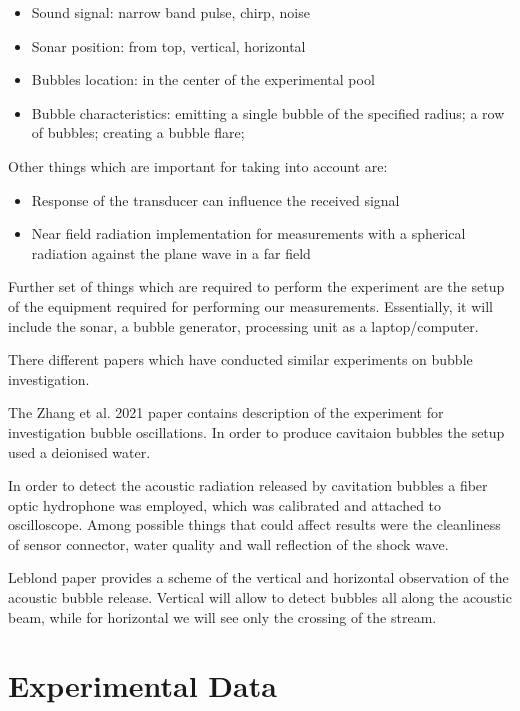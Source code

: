 \begin{itemize}
    \item  Sound signal: narrow band pulse, chirp, noise
    \item Sonar position: from top, vertical, horizontal
    \item Bubbles location: in the center of the experimental pool
   \item Bubble characteristics: emitting a single bubble of the specified radius; a row of bubbles; 
   creating a bubble flare;
\end{itemize}
Other things which are important for taking into account are:
\begin{itemize}
    \item Response of the transducer can influence the received signal
    \item Near field radiation implementation for measurements with a spherical radiation against the plane wave in a far field
\end{itemize}

Further set of things which are required to perform the experiment are the setup of the equipment required for performing our measurements. 
Essentially, it will include the sonar, a bubble generator, processing unit as a laptop/computer.

There different papers which have conducted similar experiments on bubble investigation. 

The Zhang et al. 2021\cite{zhang_experimental_2021} paper contains description of the experiment for investigation bubble oscillations. In order to produce cavitaion bubbles the setup used a deionised water.

In order to detect the acoustic radiation released by cavitation bubbles a fiber optic hydrophone was employed, which was calibrated and attached to oscilloscope.  
Among possible things that could affect results were the cleanliness of sensor connector, water quality and wall reflection of the shock wave.

Leblond paper provides a scheme of the vertical and horizontal observation of the acoustic bubble release\cite{leblond_acoustic_2014}. Vertical will allow to detect bubbles all along the acoustic beam, while for horizontal we will see only the crossing of the stream.

\section{Experimental Data}


